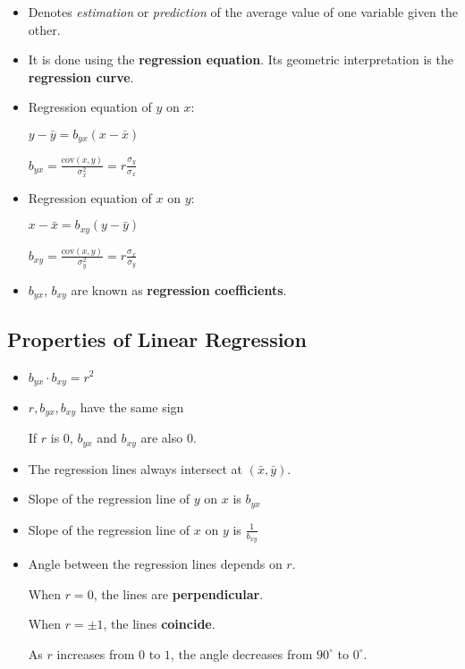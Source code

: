 \begin{itemize}
    \item Denotes \textit{estimation} or \textit{prediction} of the average value of one variable given the other.
    \item It is done using the \textbf{regression equation}. Its geometric interpretation is the \textbf{regression curve}.
    \item Regression equation of $y$ on $x$:
        
        $y - \bar{y} = b_{yx} (x - \bar{x})$

        $b_{yx} = \frac{\text{cov}(x, y)}{\sigma_x^2} = r \frac{\sigma_y}{\sigma_x}$

    \item Regression equation of $x$ on $y$:

        $x - \bar{x} = b_{xy} (y - \bar{y})$

        $b_{xy} = \frac{\text{cov}(x, y)}{\sigma_y^2} = r \frac{\sigma_x}{\sigma_y}$

    \item $b_{yx}$, $b_{xy}$ are known as \textbf{regression coefficients}.

\end{itemize}

\subsection*{Properties of Linear Regression}

\begin{itemize}
    \item $b_{yx} \cdot b_{xy} = r^2$
    \item $r, b_{yx}, b_{xy}$ have the same sign

        If $r$ is $0$, $b_{yx}$ and $b_{xy}$ are also $0$.

    \item The regression lines always intersect at $(\bar{x}, \bar{y})$.

    \item Slope of the regression line of $y$ on $x$ is $b_{yx}$

    \item Slope of the regression line of $x$ on $y$ is $\frac{1}{b_{xy}}$

    \item Angle between the regression lines depends on $r$.

        When $r = 0$, the lines are \textbf{perpendicular}.

        When $r = \pm 1$, the lines \textbf{coincide}.

        As $r$ increases from $0$ to $1$, the angle decreases from $90^\circ$ to $0^\circ$.
\end{itemize}

